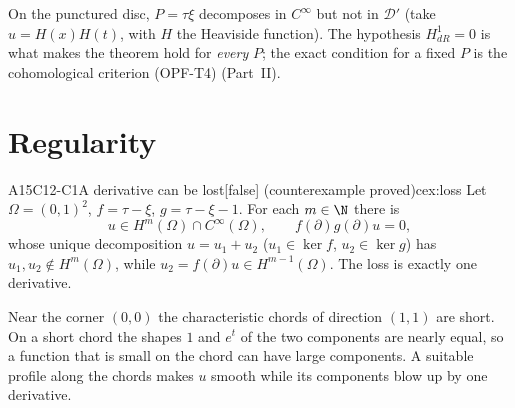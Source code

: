 \documentclass[11pt,a4paper,oneside]{report}
\newcommand{\badge}[2]{\textcolor{#1}{\textsf{\footnotesize[#2]}}}
\newcommand{\falsest}{\badge{cB}{false}}
\newcommand{\led}[1]{\textcolor{cG}{\textsf{\footnotesize(#1)}}}
\newenvironment{dimcard}[5]{\par\Needspace{12\baselineskip}\begin{dimcardbox}{#1}{#2}{#3}{#4}{#5}}{\end{dimcardbox}}
\begin{document}
\begin{caution}[title={For a fixed $P$ the condition is subtler}]
On the punctured disc, $P=\tau\xi$ decomposes in $C^\infty$ but not in $\mathcal D'$ (take $u=H(x)H(t)$, with $H$ the Heaviside function). The hypothesis $H^1_{dR}=0$ is what makes the theorem hold for \emph{every} $P$; the exact condition for a fixed $P$ is the cohomological criterion \led{OPF-T4} (Part~II).
\end{caution}

\section{Regularity}

\begin{dimcard}{A15}{C12-C1}{A derivative can be lost}{\falsest{} (counterexample proved)}{cex:loss}
Let $\Omega=(0,1)^2$, $f=\tau-\xi$, $g=\tau-\xi-1$. For each $m\in\N$ there is
\[
u\in H^m(\Omega)\cap C^\infty(\Omega),\qquad f(\partial)g(\partial)u=0,
\]
whose unique decomposition $u=u_1+u_2$ ($u_1\in\ker f$, $u_2\in\ker g$) has $u_1,u_2\notin H^m(\Omega)$, while $u_2=f(\partial)u\in H^{m-1}(\Omega)$. The loss is exactly one derivative.
\end{dimcard}

\begin{proofidea}
Near the corner $(0,0)$ the characteristic chords of direction $(1,1)$ are short. On a short chord the shapes $1$ and $e^t$ of the two components are nearly equal, so a function that is small on the chord can have large components. A suitable profile along the chords makes $u$ smooth while its components blow up by one derivative.
\end{proofidea}
\end{document}
